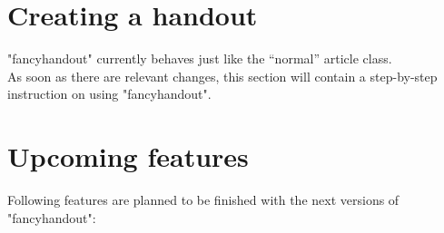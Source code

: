 \documentclass[11pt]{ltxdoc}
\begin{document}
	
	\section{Creating a handout}
	"fancyhandout" currently behaves just like the \enquote{normal} article class. \\
	As soon as there are relevant changes, this section will contain a step-by-step instruction on using "fancyhandout".
	
	
	\clearpage
	\section{Upcoming features}
	Following features are planned to be finished with the next versions of "fancyhandout":
\end{document}

